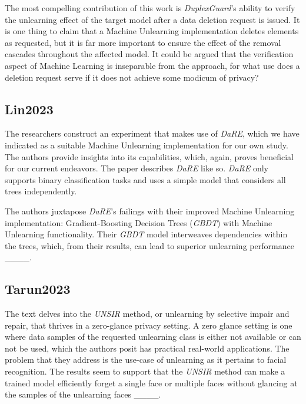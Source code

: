         The most compelling contribution of this work is \textit{DuplexGuard}'s ability to verify the unlearning effect of the target model after a data deletion request is issued. It is one thing to claim that a Machine Unlearning implementation deletes elements as requested, but it is far more important to ensure the effect of the removal cascades throughout the affected model. It could be argued that the verification aspect of Machine Learning is inseparable from the approach, for what use does a deletion request serve if it does not achieve some modicum of privacy?
    
    \subsection{Lin2023}
    \label{subsec:Lin2023}
    
        The researchers construct an experiment that makes use of \textit{DaRE}, which we have indicated as a suitable Machine Unlearning implementation for our own study. The authors provide insights into its capabilities, which, again, proves beneficial for our current endeavors. The paper describes \textit{DaRE} like so. \textit{DaRE} only supports binary classification tasks and uses a simple model that considers all trees independently.
        
        The authors juxtapose \textit{DaRE}'s failings with their improved Machine Unlearning implementation: Gradient-Boosting Decision Trees (\textit{GBDT}) with Machine Unlearning functionality. Their \textit{GBDT} model interweaves dependencies within the trees, which, from their results, can lead to superior unlearning performance ____.
    
    \subsection{Tarun2023}
    \label{subsec:Tarun2023}
    
        The text delves into the \textit{UNSIR} method, or unlearning by selective impair and repair, that thrives in a zero-glance privacy setting. A zero glance setting is one where data samples of the requested unlearning class is either not available or can not be used, which the authors posit has practical real-world applications. The problem that they address is the use-case of unlearning as it pertains to facial recognition. The results seem to support that the \textit{UNSIR} method can make a trained model efficiently forget a single face or multiple faces without glancing at the samples of the unlearning faces ____.
        
